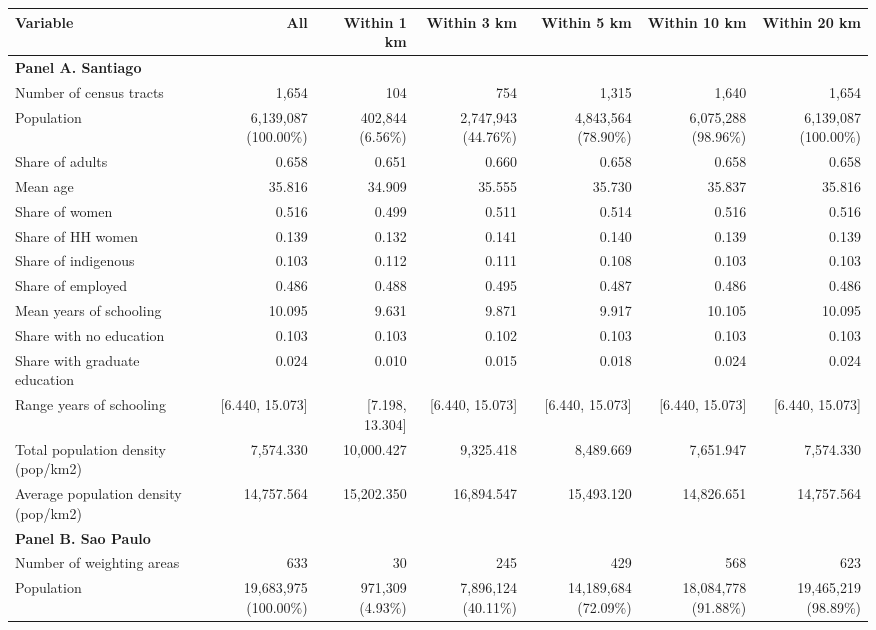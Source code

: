 \begin{tabular}{lrrrrrr}
    \midrule
    \midrule
    \textbf{Variable} & \textbf{All} & \textbf{Within 1 km} & \textbf{Within 3 km} & \textbf{Within 5 km} & \textbf{Within 10 km} & \textbf{Within 20 km} \\
    \midrule
    \multicolumn{7}{l}{\textbf{Panel A. Santiago}} \\
    \midrule
    Number of census tracts & 1,654 & 104 & 754 & 1,315 & 1,640 & 1,654 \\
    Population & 6,139,087 (100.00\%) & 402,844 (6.56\%) & 2,747,943 (44.76\%) & 4,843,564 (78.90\%) & 6,075,288 (98.96\%) & 6,139,087 (100.00\%) \\
    Share of adults & 0.658 & 0.651 & 0.660 & 0.658 & 0.658 & 0.658 \\
    Mean age & 35.816 & 34.909 & 35.555 & 35.730 & 35.837 & 35.816 \\
    Share of women & 0.516 & 0.499 & 0.511 & 0.514 & 0.516 & 0.516 \\
    Share of HH women & 0.139 & 0.132 & 0.141 & 0.140 & 0.139 & 0.139 \\
    Share of indigenous & 0.103 & 0.112 & 0.111 & 0.108 & 0.103 & 0.103 \\
    Share of employed & 0.486 & 0.488 & 0.495 & 0.487 & 0.486 & 0.486 \\
    Mean years of schooling & 10.095 & 9.631 & 9.871 & 9.917 & 10.105 & 10.095 \\
    Share with no education & 0.103 & 0.103 & 0.102 & 0.103 & 0.103 & 0.103 \\
    Share with graduate education & 0.024 & 0.010 & 0.015 & 0.018 & 0.024 & 0.024 \\
    Range years of schooling & [6.440, 15.073] & [7.198, 13.304] & [6.440, 15.073] & [6.440, 15.073] & [6.440, 15.073] & [6.440, 15.073] \\
    Total population density (pop/km2) & 7,574.330 & 10,000.427 & 9,325.418 & 8,489.669 & 7,651.947 & 7,574.330 \\
    Average population density (pop/km2) & 14,757.564 & 15,202.350 & 16,894.547 & 15,493.120 & 14,826.651 & 14,757.564 \\
    \midrule
    \multicolumn{7}{l}{\textbf{Panel B. Sao Paulo}} \\
    \midrule
    Number of weighting areas & 633 & 30 & 245 & 429 & 568 & 623 \\
    Population & 19,683,975 (100.00\%) & 971,309 (4.93\%) & 7,896,124 (40.11\%) & 14,189,684 (72.09\%) & 18,084,778 (91.88\%) & 19,465,219 (98.89\%) \\

\end{tabular}
